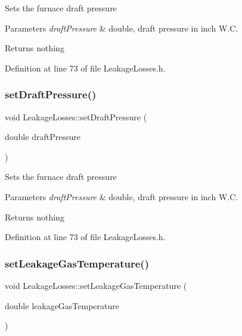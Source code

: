 Sets the furnace draft pressure


\begin{DoxyParams}{Parameters}
{\em draft\+Pressure} & double, draft pressure in inch W.\+C.\\
\hline
\end{DoxyParams}
\begin{DoxyReturn}{Returns}
nothing 
\end{DoxyReturn}


Definition at line 73 of file Leakage\+Losses.\+h.

\mbox{\label{class_leakage_losses_a33f31dc336fc6af0fd1e8c8739f37b1a}} 
\subsubsection{\texorpdfstring{set\+Draft\+Pressure()}{setDraftPressure()}\hspace{0.1cm}{\footnotesize\ttfamily [3/3]}}
{\footnotesize\ttfamily void Leakage\+Losses\+::set\+Draft\+Pressure (\begin{DoxyParamCaption}\item[{double}]{draft\+Pressure }\end{DoxyParamCaption})\hspace{0.3cm}{\ttfamily [inline]}}

Sets the furnace draft pressure


\begin{DoxyParams}{Parameters}
{\em draft\+Pressure} & double, draft pressure in inch W.\+C.\\
\hline
\end{DoxyParams}
\begin{DoxyReturn}{Returns}
nothing 
\end{DoxyReturn}


Definition at line 73 of file Leakage\+Losses.\+h.

\mbox{\label{class_leakage_losses_a379c88c8dea822636a1b9966e2408daa}} 
\subsubsection{\texorpdfstring{set\+Leakage\+Gas\+Temperature()}{setLeakageGasTemperature()}\hspace{0.1cm}{\footnotesize\ttfamily [1/3]}}
{\footnotesize\ttfamily void Leakage\+Losses\+::set\+Leakage\+Gas\+Temperature (\begin{DoxyParamCaption}\item[{double}]{leakage\+Gas\+Temperature }\end{DoxyParamCaption})\hspace{0.3cm}{\ttfamily [inline]}}

